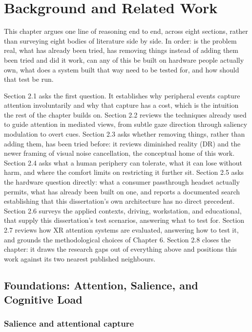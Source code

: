 \chapter{Background and Related Work}

This chapter argues one line of reasoning end to end, across eight sections, rather than
surveying eight bodies of literature side by side. In order: is the problem real, what has
already been tried, has removing things instead of adding them been tried and did it work,
can any of this be built on hardware people actually own, what does a system built that way
need to be tested for, and how should that test be run.

Section 2.1 asks the first question. It establishes why peripheral events capture attention
involuntarily and why that capture has a cost, which is the intuition the rest of the chapter
builds on. Section 2.2 reviews the techniques already used to guide attention in mediated
views, from subtle gaze direction through saliency modulation to overt cues. Section 2.3 asks
whether removing things, rather than adding them, has been tried before: it reviews diminished
reality (DR) and the newer framing of visual noise cancellation, the conceptual home of this
work. Section 2.4 asks what a human periphery can tolerate, what it can lose without harm, and
where the comfort limits on restricting it further sit. Section 2.5 asks the hardware question
directly: what a consumer passthrough headset actually permits, what has already been built on
one, and reports a documented search establishing that this dissertation's own architecture has
no direct precedent. Section 2.6 surveys the applied contexts, driving, workstation, and
educational, that supply this dissertation's test scenarios, answering what to test for.
Section 2.7 reviews how XR attention systems are evaluated, answering how to test it, and
grounds the methodological choices of Chapter 6. Section 2.8 closes the chapter: it draws the
research gaps out of everything above and positions this work against its two nearest
published neighbours.

\section{Foundations: Attention, Salience, and Cognitive Load}

\subsection{Salience and attentional capture}

